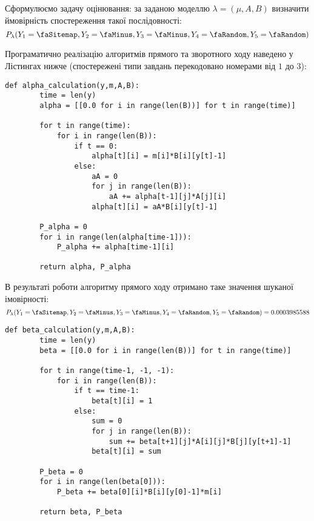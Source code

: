\vspace{0.4cm}
Сформулюємо задачу оцінювання: за заданою моделлю $\lambda=(\mu, A, B)$ визначити ймовірність спостереження такої послідовності:
\begin{equation*}
    P_\lambda(Y_1=\text{\faSitemap},Y_2=\text{\faMinus},Y_3=\text{\faMinus},Y_4=\text{\faRandom},Y_5=\text{\faRandom})
\end{equation*}

Програматично реалізацію алгоритмів прямого та зворотного ходу наведено у Лістингах нижче (спостережені типи завдань перекодовано номерами від $1$ до $3$):

\begin{lstlisting}[firstnumber=1, label = code: alpha, caption = Алгоритм прямого ходу]
    def alpha_calculation(y,m,A,B):
        time = len(y)
        alpha = [[0.0 for i in range(len(B))] for t in range(time)]

        for t in range(time):
            for i in range(len(B)):
                if t == 0: 
                    alpha[t][i] = m[i]*B[i][y[t]-1]
                else:
                    aA = 0
                    for j in range(len(B)):
                        aA += alpha[t-1][j]*A[j][i]
                    alpha[t][i] = aA*B[i][y[t]-1]

        P_alpha = 0
        for i in range(len(alpha[time-1])):
            P_alpha += alpha[time-1][i]

        return alpha, P_alpha
\end{lstlisting}

\vspace{0.4cm}
В результаті роботи алгоритму прямого ходу отримано таке значення шуканої імовірності:
\begin{equation*}
    P_\lambda(Y_1=\text{\faSitemap},Y_2=\text{\faMinus},Y_3=\text{\faMinus},Y_4=\text{\faRandom},Y_5=\text{\faRandom}) = 0.0003985588
\end{equation*}

\begin{lstlisting}[firstnumber=1, label = code: beta, caption = Алгоритм зворотного ходу]
    def beta_calculation(y,m,A,B):
        time = len(y)
        beta = [[0.0 for i in range(len(B))] for t in range(time)]

        for t in range(time-1, -1, -1):
            for i in range(len(B)):
                if t == time-1: 
                    beta[t][i] = 1
                else:
                    sum = 0
                    for j in range(len(B)):
                        sum += beta[t+1][j]*A[i][j]*B[j][y[t+1]-1]
                    beta[t][i] = sum

        P_beta = 0
        for i in range(len(beta[0])):
            P_beta += beta[0][i]*B[i][y[0]-1]*m[i]

        return beta, P_beta
\end{lstlisting}

